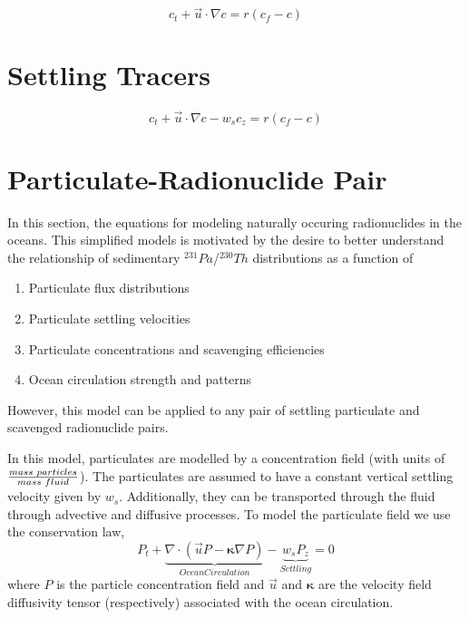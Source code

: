 \documentclass{softwaremanual}
\begin{document}
\begin{equation}
 c_t + \vec{u} \cdot \nabla c = r( c_f - c )
\end{equation}

\section{Settling Tracers}

\begin{equation}
 c_t + \vec{u} \cdot \nabla c -w_s c_z = r( c_f - c )
\end{equation}

\section{Particulate-Radionuclide Pair}
In this section, the equations for modeling naturally occuring radionuclides in the oceans. This simplified models is motivated by the desire to better understand the relationship of sedimentary $^{231}Pa$/$^{230}Th$ distributions as a function of 
\begin{enumerate}
\item Particulate flux distributions
\item Particulate settling velocities
\item Particulate concentrations and scavenging efficiencies
\item Ocean circulation strength and patterns
\end{enumerate}
However, this model can be applied to any pair of settling particulate and scavenged radionuclide pairs.

In this model, particulates are modelled by a concentration field (with units of $\frac{mass \hspace{1mm} particles}{mass \hspace{1mm} fluid}$). The particulates are assumed to have a constant vertical settling velocity given by $w_s$. Additionally, they can be transported through the fluid through advective and diffusive processes. To model the particulate field we use the conservation law,
\begin{equation}
P_t + \underbrace{\nabla \cdot ( \vec{u} P - \boldsymbol{\kappa} \nabla P ) }_{Ocean Circulation} - \underbrace{w_s P_z}_{Settling} = 0
\end{equation}
where $P$ is the particle concentration field and $\vec{u}$ and $\boldsymbol{\kappa}$ are the velocity field diffusivity tensor (respectively) associated with the ocean circulation.
\end{document}
